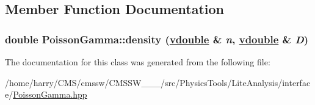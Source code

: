 \subsection{Member Function Documentation}
\hypertarget{classPoissonGamma_a2}{
\subsubsection[density]{\setlength{\rightskip}{0pt plus 5cm}double Poisson\-Gamma::density (\hyperlink{PoissonGammaFit_8hpp_a0}{vdouble} \& {\em n}, \hyperlink{PoissonGammaFit_8hpp_a0}{vdouble} \& {\em D})}}
\label{classPoissonGamma_a2}




The documentation for this class was generated from the following file:\begin{CompactItemize}
\item 
/home/harry/CMS/cmssw/CMSSW\_\_\_/src/Physics\-Tools/Lite\-Analysis/interface/\hyperlink{PoissonGamma_8hpp}{Poisson\-Gamma.hpp}\end{CompactItemize}
